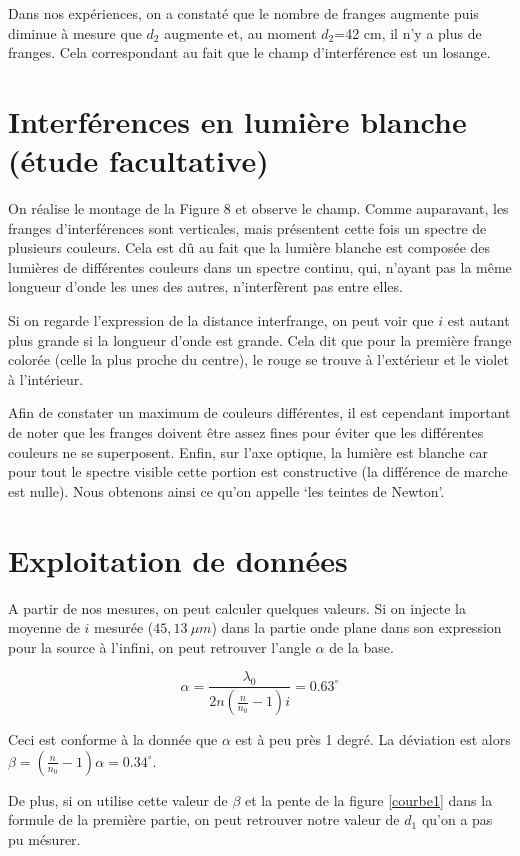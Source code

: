 \documentclass[11pt, a4paper]{article}
\begin{document}
Dans nos expériences, on a constaté que le nombre de franges augmente puis diminue à mesure que $d_2$ augmente et, au moment $d_2$=42 cm, il n'y a plus de franges. Cela correspondant au fait que le champ d'interférence est un losange.


\section{Interférences en lumière blanche (étude facultative)}
On réalise le montage de la Figure 8 et observe le champ. Comme auparavant, les franges d'interférences sont verticales, mais présentent cette fois un spectre de plusieurs couleurs. Cela est dû au fait que la lumière blanche est composée des lumières de différentes couleurs dans un spectre continu, qui, n'ayant pas la même longueur d'onde les unes des autres, n'interfèrent pas entre elles.

Si on regarde l'expression de la distance interfrange, on peut voir que $i$ est autant plus grande si la longueur d'onde est grande. Cela dit que pour la première frange colorée (celle la plus proche du centre), le rouge se trouve à l'extérieur et le violet à l'intérieur.

Afin de constater un maximum de couleurs différentes, il est cependant important de noter que les franges doivent être assez fines pour éviter que les différentes couleurs ne se superposent. Enfin, sur l'axe optique, la lumière est blanche car pour tout le spectre visible cette portion est constructive (la différence de marche est nulle). Nous obtenons ainsi ce qu'on appelle ‘les teintes de Newton'.

\section{Exploitation de données}
A partir de nos mesures, on peut calculer quelques valeurs. Si on injecte la moyenne de $i$ mesurée ($45,13\ \mu m$) dans la partie onde plane dans son expression pour la source à l'infini, on peut retrouver l'angle $\alpha$ de la base.

$$
    \alpha =  \frac{\lambda_0}{2n\left(\frac{n}{n_0}-1\right)i} = 0.63^\circ
$$

Ceci est conforme à la donnée que $\alpha$ est à peu près 1 degré. La déviation est alors $\beta=\left(\frac{n}{n_0}-1\right)\alpha=0.34^\circ$.

De plus, si on utilise cette valeur de $\beta$ et la pente de la figure \ref{courbe1} dans la formule de la première partie, on peut retrouver notre valeur de $d_1$ qu'on a pas pu mésurer.
\end{document}
